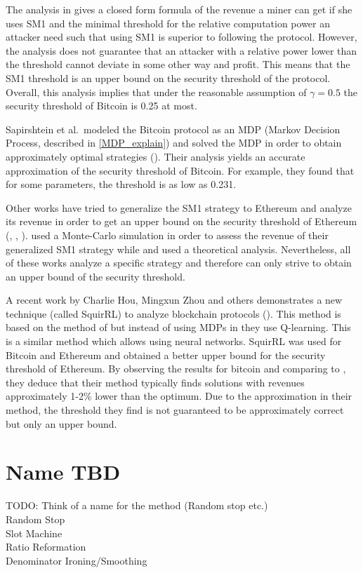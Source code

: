 \documentclass{article}
\begin{document}
The analysis in \cite{eyalmajority} gives a closed form formula of the revenue a miner can get if she uses SM1 and the minimal threshold for the relative computation power an attacker need such that using SM1 is superior to following the protocol. However, the analysis does not guarantee that an attacker with a relative power lower than the threshold cannot deviate in some other way and profit. This means that the SM1 threshold is an upper bound on the security threshold of the protocol. Overall, this analysis implies that under the reasonable assumption of $\gamma = 0.5$ the security threshold of Bitcoin is 0.25 at most.

Sapirshtein et al.~modeled the Bitcoin protocol as an MDP (Markov Decision Process, described in \ref{MDP_explain}) and solved the MDP in order to obtain approximately optimal strategies (\cite{sapirshtein2016optimal}). Their analysis yields an accurate approximation of the security threshold of Bitcoin. For example, they found that for some parameters, the threshold is as low as 0.231. 

Other works have tried to generalize the SM1 strategy to Ethereum and analyze its revenue in order to get an upper bound on the security threshold of Ethereum (\cite{ritz2018impact}, \cite{feng2019selfish}, \cite{grunspan2019selfish}). \cite{ritz2018impact} used a Monte-Carlo simulation in order to assess the revenue of their generalized SM1 strategy while \cite{feng2019selfish} and \cite{grunspan2019selfish} used a theoretical analysis. Nevertheless, all of these works analyze a specific strategy and therefore can only strive to obtain an upper bound of the security threshold.

A recent work by Charlie Hou, Mingxun Zhou and others demonstrates a new technique (called SquirRL) to analyze blockchain protocols (\cite{hou2019squirrl}). This method is based on the method of \cite{sapirshtein2016optimal} but instead of using MDPs in they use Q-learning. This is a similar method which allows using neural networks. SquirRL was used for Bitcoin and Ethereum and obtained a better upper bound for the security threshold of Ethereum.  By observing the results for bitcoin and comparing to \cite{sapirshtein2016optimal}, they deduce that their method typically finds solutions with revenues approximately 1-2\% lower than the optimum. Due to the approximation in their method, the threshold they find is not guaranteed to be approximately correct but only an upper bound.

\section{Name TBD}
TODO: Think of a name for the method (Random stop etc.)\\
Random Stop\\
Slot Machine\\
Ratio Reformation\\
Denominator Ironing/Smoothing\\
\end{document}
